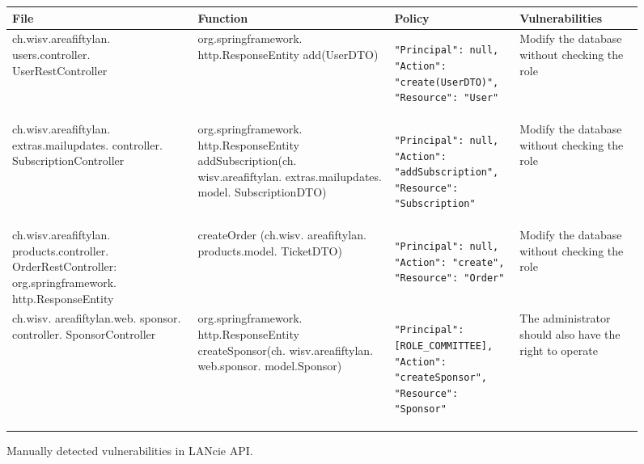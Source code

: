 \onecolumn
\begin{sidewaysfigure}[p]
  \caption{Manually detected vulnerabilities in LANcie API.}
  \label{tab:api}
  \centering
  \begin{tabular}{ |p{} | p{} | p{} | p{}|}
    \hline
    File                                                       & Function & Policy & Vulnerabilities \\
    \hline
    ch.wisv.areafiftylan. users.controller. UserRestController &
    org.springframework. http.ResponseEntity add(UserDTO)      &
    \begin{lstlisting}
"Principal": null,
"Action": "create(UserDTO)",
"Resource": "User"
    \end{lstlisting}                                     &
    Modify the database without checking the role                                                    \\
    \hline
    
    \hline
    ch.wisv.areafiftylan. extras.mailupdates. controller. SubscriptionController &
    org.springframework. http.ResponseEntity addSubscription(ch. wisv.areafiftylan. extras.mailupdates. model. SubscriptionDTO)      &
    \begin{lstlisting}
"Principal": null,
"Action": "addSubscription",
"Resource": "Subscription"
    \end{lstlisting}                                     &
    Modify the database without checking the role                                                    \\
    \hline
    
    \hline
    ch.wisv.areafiftylan. products.controller. OrderRestController:  org.springframework. http.ResponseEntity &
    createOrder (ch.wisv. areafiftylan. products.model. TicketDTO) &
    \begin{lstlisting}
"Principal": null,
"Action": "create",
"Resource": "Order"
    \end{lstlisting}                                     &
    Modify the database without checking the role                                                    \\
    \hline
    
    \hline
    ch.wisv. areafiftylan.web. sponsor. controller. SponsorController &
    org.springframework. http.ResponseEntity  createSponsor(ch. wisv.areafiftylan. web.sponsor. model.Sponsor)   &
    \begin{lstlisting}
"Principal":[ROLE_COMMITTEE],
"Action": "createSponsor",
"Resource": "Sponsor"
    \end{lstlisting}                                     &
    The administrator should also have the right to operate                                                    \\
    \hline
  \end{tabular}
\end{sidewaysfigure}
\twocolumn
